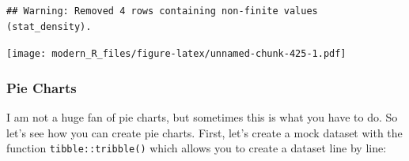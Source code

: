 \documentclass[]{gitbook}
\newenvironment{Shaded}{\begin{snugshade}}{\end{snugshade}}
\newcommand{\DataTypeTok}[1]{\textcolor[rgb]{0.13,0.29,0.53}{#1}}
\newcommand{\DecValTok}[1]{\textcolor[rgb]{0.00,0.00,0.81}{#1}}
\newcommand{\KeywordTok}[1]{\textcolor[rgb]{0.13,0.29,0.53}{\textbf{#1}}}
\newcommand{\NormalTok}[1]{#1}
\newcommand{\OperatorTok}[1]{\textcolor[rgb]{0.81,0.36,0.00}{\textbf{#1}}}
\newcommand{\StringTok}[1]{\textcolor[rgb]{0.31,0.60,0.02}{#1}}
\begin{document}
\begin{Shaded}
\end{Shaded}

\begin{verbatim}
## Warning: Removed 4 rows containing non-finite values (stat_density).
\end{verbatim}

\texttt{[image: modern\_R\_files/figure-latex/unnamed-chunk-425-1.pdf]}

\hypertarget{pie-charts}{%
\subsubsection{Pie Charts}\label{pie-charts}}

I am not a huge fan of pie charts, but sometimes this is what you have to do. So let's see how you
can create pie charts.
First, let's create a mock dataset with the function \texttt{tibble::tribble()} which allows you to create a
dataset line by line:
\end{document}
